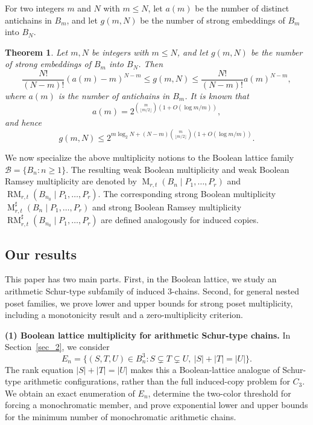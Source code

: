 \documentclass[twoside,12pt]{article}
\newtheorem{theorem}{Theorem}[section]
\begin{document}
For two integers $m$ and $N$ with $m\leq N$, let $a(m)$ be the number of distinct antichains in $B_m$, and let $g(m,N)$ be the number of strong embeddings of $B_m$ into $B_N$.

\begin{theorem}{\upshape\cite{AW17}}\label{number_b_n}
Let $m,N$ be integers with $m\leq N$, and let $g(m,N)$ be the number of strong embeddings of $B_m$ into $B_N$. Then
\[
\frac{N!}{(N-m)!}(a(m)-m)^{N-m}
\leq g(m,N)\leq
\frac{N!}{(N-m)!}a(m)^{N-m},
\]
where $a(m)$ is the number of antichains in $B_m$. It is known \cite{KM} that
\[
a(m)=2^{\binom{m}{\lfloor m/2\rfloor}(1+O(\log m/m))},
\]
and hence
\[
g(m,N)\leq 2^{m\log_2 N+(N-m)\binom{m}{\lfloor m/2\rfloor}(1+O(\log m/m))}.
\]
\end{theorem}

We now specialize the above multiplicity notions to the Boolean lattice family $\mathcal B=\{B_n:n\geq1\}$. The resulting weak Boolean multiplicity and weak Boolean Ramsey multiplicity are denoted by $\operatorname M_{r,t}(B_n\mid P_1,\dots,P_r)$ and $\operatorname{RM}_{r,t}(B_{n_0}\mid P_1,\dots,P_r)$. The corresponding strong Boolean multiplicity $\operatorname M_{r,t}^{\sharp}(B_n\mid P_1,\dots,P_r)$ and strong Boolean Ramsey multiplicity $\operatorname{RM}_{r,t}^{\sharp}(B_{n_0}\mid P_1,\dots,P_r)$ are defined analogously for induced copies.

\subsection{Our results}

This paper has two main parts. First, in the Boolean lattice, we study an arithmetic Schur-type subfamily of induced $3$-chains. Second, for general nested poset families, we prove lower and upper bounds for strong poset multiplicity, including a monotonicity result and a zero-multiplicity criterion.

\medskip\noindent\textbf{(1) Boolean lattice multiplicity for arithmetic Schur-type chains.}
In Section~\ref{sec_2}, we consider
\[
 E_n=\{(S,T,U)\in B_n^3:S\subsetneq T\subsetneq U,\ |S|+|T|=|U|\}.
\]
The rank equation $|S|+|T|=|U|$ makes this a Boolean-lattice analogue of Schur-type arithmetic configurations, rather than the full induced-copy problem for $C_3$. We obtain an exact enumeration of $E_n$, determine the two-color threshold for forcing a monochromatic member, and prove exponential lower and upper bounds for the minimum number of monochromatic arithmetic chains.
\end{document}
